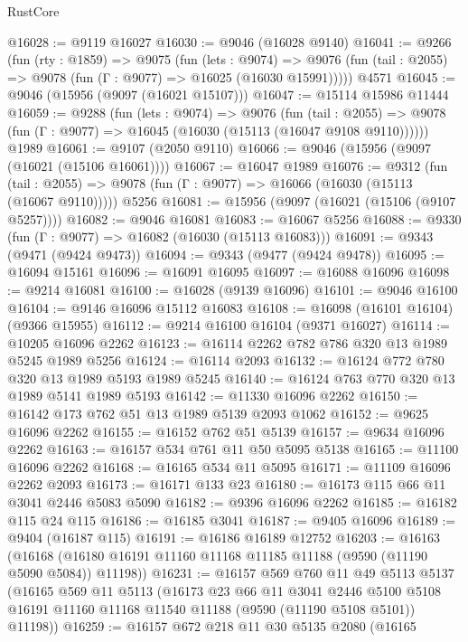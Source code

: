 \begin{lexlean}{RustCore}
\begin{coremodule}
@16028 := @9119 @16027
@16030 := @9046 (@16028 @9140)
@16041 := @9266
    (fun (rty : @1859) =>
    @9075
      (fun (lets : @9074) =>
      @9076 (fun (tail : @2055) => @9078 (fun (Γ : @9077) => @16025 (@16030 @15991)))))
    @4571
@16045 := @9046 (@15956 (@9097 (@16021 @15107)))
@16047 := @15114 @15986 @11444
@16059 := @9288
    (fun (lets : @9074) =>
    @9076
      (fun (tail : @2055) =>
      @9078 (fun (Γ : @9077) => @16045 (@16030 (@15113 (@16047 @9108 @9110))))))
    @1989
@16061 := @9107 (@2050 @9110)
@16066 := @9046 (@15956 (@9097 (@16021 (@15106 @16061))))
@16067 := @16047 @1989
@16076 := @9312
    (fun (tail : @2055) => @9078 (fun (Γ : @9077) => @16066 (@16030 (@15113 (@16067 @9110)))))
    @5256
@16081 := @15956 (@9097 (@16021 (@15106 (@9107 @5257))))
@16082 := @9046 @16081
@16083 := @16067 @5256
@16088 := @9330 (fun (Γ : @9077) => @16082 (@16030 (@15113 @16083)))
@16091 := @9343 (@9471 (@9424 @9473))
@16094 := @9343 (@9477 (@9424 @9478))
@16095 := @16094 @15161
@16096 := @16091 @16095
@16097 := @16088 @16096
@16098 := @9214 @16081
@16100 := @16028 (@9139 @16096)
@16101 := @9046 @16100
@16104 := @9146 @16096 @15112 @16083
@16108 := @16098 (@16101 @16104) (@9366 @15955)
@16112 := @9214 @16100 @16104 (@9371 @16027)
@16114 := @10205 @16096 @2262
@16123 := @16114 @2262 @782 @786 @320 @13 @1989 @5245 @1989 @5256
@16124 := @16114 @2093
@16132 := @16124 @772 @780 @320 @13 @1989 @5193 @1989 @5245
@16140 := @16124 @763 @770 @320 @13 @1989 @5141 @1989 @5193
@16142 := @11330 @16096 @2262
@16150 := @16142 @173 @762 @51 @13 @1989 @5139 @2093 @1062
@16152 := @9625 @16096 @2262
@16155 := @16152 @762 @51 @5139
@16157 := @9634 @16096 @2262
@16163 := @16157 @534 @761 @11 @50 @5095 @5138
@16165 := @11100 @16096 @2262
@16168 := @16165 @534 @11 @5095
@16171 := @11109 @16096 @2262 @2093
@16173 := @16171 @133 @23
@16180 := @16173 @115 @66 @11 @3041 @2446 @5083 @5090
@16182 := @9396 @16096 @2262
@16185 := @16182 @115 @24 @115
@16186 := @16185 @3041
@16187 := @9405 @16096
@16189 := @9404 (@16187 @115)
@16191 := @16186 @16189 @12752
@16203 := @16163
    (@16168 (@16180 @16191 @11160 @11168 @11185 @11188 (@9590 (@11190 @5090 @5084)) @11198))
@16231 := @16157
    @569
    @760
    @11
    @49
    @5113
    @5137
    (@16165
      @569
      @11
      @5113
      (@16173
        @23
        @66
        @11
        @3041
        @2446
        @5100
        @5108
        @16191
        @11160
        @11168
        @11540
        @11188
        (@9590 (@11190 @5108 @5101))
        @11198))
@16259 := @16157
    @672
    @218
    @11
    @30
    @5135
    @2080
    (@16165

\end{coremodule}
\end{lexlean}
